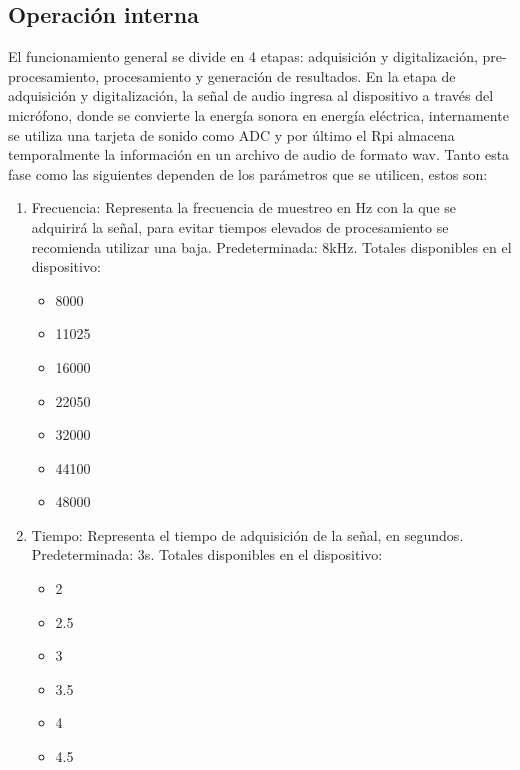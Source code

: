 \documentclass[11pt,lettersize]{article} %
\begin{document}
\subsection{Operación interna}
\label{S-operacion}
El funcionamiento general se divide en 4 etapas: adquisición y digitalización, pre-procesamiento, procesamiento y generación de resultados. En la etapa de adquisición y digitalización, la señal de audio ingresa al dispositivo a través del micrófono, donde se convierte la energía sonora en energía eléctrica, internamente se utiliza una tarjeta de sonido como ADC y por último el Rpi almacena temporalmente la información en un archivo de audio de formato wav. Tanto esta fase como las siguientes dependen de los parámetros que se utilicen, estos son:
\begin{enumerate}
	\item Frecuencia: Representa la frecuencia de muestreo en Hz con la que se adquirirá la señal, para evitar tiempos elevados de procesamiento se recomienda utilizar una baja. Predeterminada: 8kHz. Totales disponibles en el dispositivo:
	\begin{multicols}{2}
		\begin{itemize}[nolistsep]
			\item 8000
			\item 11025
			\item 16000
			\item 22050
			\item 32000
			\item 44100
			\item 48000
		\end{itemize}
	\end{multicols}

	\item Tiempo: Representa el tiempo de adquisición de la señal, en segundos. Predeterminada: 3s. Totales disponibles en el dispositivo:
	\begin{multicols}{2}
		\begin{itemize}[nolistsep]
			\item 2
			\item 2.5
			\item 3
			\item 3.5
			\item 4
			\item 4.5
		\end{itemize}
	\end{multicols}
\end{enumerate}
\end{document}
